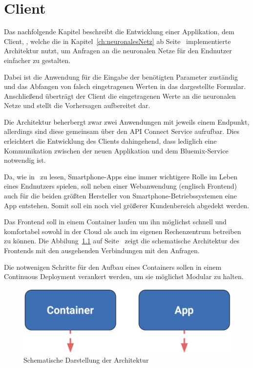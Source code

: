 \chapter{Client}
\label{ch:client}
Das nachfolgende Kapitel beschreibt die Entwicklung einer Applikation, dem Client, , welche die in
Kapitel~\ref{ch:neuronalesNetz} ab Seite~\pageref{ch:neuronalesNetz} implementierte Architektur nutzt, um Anfragen an
die neuronalen Netze für den Endnutzer einfacher zu gestalten.

Dabei ist die Anwendung für die Eingabe der benötigten Parameter zuständig und das Abfangen von falsch eingetragenen
Werten in das dargestellte Formular. Anschließend überträgt der Client die eingetragenen Werte an die neuronalen Netze
und stellt die Vorhersagen aufbereitet dar.

Die Architektur beherbergt zwar zwei Anwendungen mit jeweils einem Endpunkt, allerdings sind diese gemeinsam über
den API Connect Service aufrufbar. Dies erleichtert die Entwicklung des Clients dahingehend, dass lediglich eine
Kommunikation zwischen der neuen Applikation und dem Bluemix-Service notwendig ist.

Da, wie in~\cite{online_client_apps} zu lesen, Smartphone-Apps eine immer wichtigere Rolle im Leben eines Endnutzers
spielen, soll neben einer Webanwendung (englisch Frontend) auch für die beiden größten Hersteller von
Smartphone-Betriebssystemen eine App entstehen. Somit soll ein noch viel größerer Kundenbereich abgedekt werden.

Das Frontend soll in einem Container laufen um ihn möglichst schnell und komfortabel sowohl in der Cloud als auch 
im eigenen Rechenzentrum betreiben zu können. Die Abbilung~\ref{fig:schematische_architektur_4} auf
Seite~\pageref{fig:schematische_architektur_4} zeigt die schematische Architektur des Frontends mit den ausgehenden
Verbindungen mit den Anfragen.

Die notwenigen Schritte für den Aufbau eines Containers sollen in einem Continuous Deployment verankert werden, um sie
möglichst Modular zu halten.

\begin{figure}[h]
    \centering
    \includegraphics[scale=0.5]{images/kapitel_4/architektur_schematisch.pdf}
    \caption{Schematische Darstellung der Architektur}
    \label{fig:schematische_architektur_4}
\end{figure}